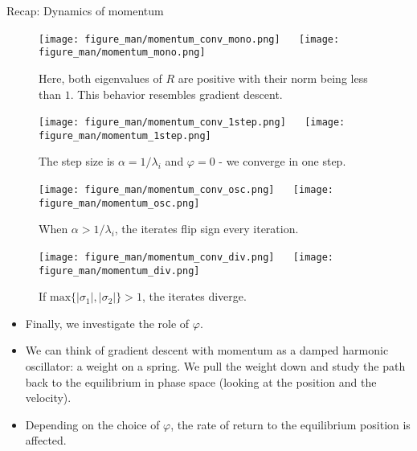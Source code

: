\documentclass[11pt,compress,t,notes=noshow, xcolor=table]{beamer}
\begin{document}
\begin{vbframe}{Recap: Dynamics of momentum}
\framebreak
\vspace*{1.0cm}
\begin{figure}
	\texttt{[image: figure\_man/momentum\_conv\_mono.png]} ~~ \texttt{[image: figure\_man/momentum\_mono.png]} \\
	\begin{footnotesize} 
		Here, both eigenvalues of $R$ are positive with their norm being less than $1$. This behavior resembles gradient descent. 
	\end{footnotesize}
\end{figure}

\framebreak
\vspace*{1.0cm}
\begin{figure}
	\texttt{[image: figure\_man/momentum\_conv\_1step.png]} ~~ \texttt{[image: figure\_man/momentum\_1step.png]} \\
	\begin{footnotesize} 
		The step size is $\alpha = 1/\lambda_i$ and $\varphi = 0$ - we converge in one step.
	\end{footnotesize}
\end{figure}
\framebreak
\vspace*{1.0cm}
\begin{figure}
	\texttt{[image: figure\_man/momentum\_conv\_osc.png]} ~~ \texttt{[image: figure\_man/momentum\_osc.png]} \\
	\begin{footnotesize} 
		When $\alpha > 1/\lambda_i$, the iterates flip sign every iteration. 
	\end{footnotesize}
\end{figure}
\framebreak
\vspace*{1.0cm}
\begin{figure}
	\texttt{[image: figure\_man/momentum\_conv\_div.png]} ~~ \texttt{[image: figure\_man/momentum\_div.png]} \\
	\begin{footnotesize} 
		If  $\text{max} \{|\sigma_1|, |\sigma_2| \} > 1$, the iterates diverge. 
	\end{footnotesize}
\end{figure}

\framebreak
\begin{itemize}
	\item Finally, we investigate the role of $\varphi$. 
	\item We can think of gradient descent with momentum as a damped harmonic oscillator: a weight on a spring. We pull the weight down and study the path back to the equilibrium in phase space (looking at the position and the velocity). 
	\item Depending on the choice of $\varphi$, the rate of return to the equilibrium position is affected. 
\end{itemize}


\end{vbframe}
\end{document}
